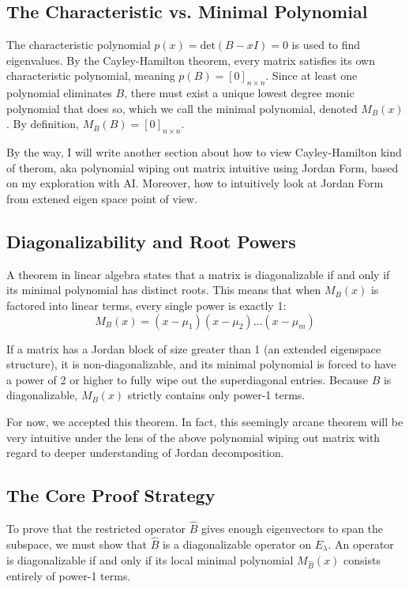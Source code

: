\documentclass{article}
\begin{document}
\subsection{The Characteristic vs. Minimal Polynomial}
The characteristic polynomial $p(x) = \text{det}(B - xI) = 0$ is used to find eigenvalues. By the Cayley-Hamilton theorem, every matrix satisfies its own characteristic polynomial, meaning $p(B) = [0]_{n \times n}$. Since at least one polynomial eliminates $B$, there must exist a unique lowest degree monic polynomial that does so, which we call the minimal polynomial, denoted $M_B(x)$. By definition, $M_B(B) = [0]_{n \times n}$.

By the way, I will write another section about how to view Cayley-Hamilton kind of therom, aka polynomial wiping out matrix intuitive using Jordan Form, based on my exploration with AI. Moreover, how to intuitively look at Jordan Form from extened eigen space point of view. 

\subsection{Diagonalizability and Root Powers}
A theorem in linear algebra states that a matrix is diagonalizable if and only if its minimal polynomial has distinct roots. This means that when $M_B(x)$ is factored into linear terms, every single power is exactly 1:
\[ M_B(x) = (x - \mu_1)(x - \mu_2)\dots(x - \mu_m) \]

If a matrix has a Jordan block of size greater than 1 (an extended eigenspace structure), it is non-diagonalizable, and its minimal polynomial is forced to have a power of 2 or higher to fully wipe out the superdiagonal entries. Because $B$ is diagonalizable, $M_B(x)$ strictly contains only power-1 terms.

For now, we accepted this theorem. In fact, this seemingly arcane theorem will be very intuitive under the lens of the above polynomial wiping out matrix with regard to deeper understanding of Jordan decomposition. 

\subsection{The Core Proof Strategy}
To prove that the restricted operator $\hat{B}$ gives enough eigenvectors to span the subspace, we must show that $\hat{B}$ is a diagonalizable operator on $E_\lambda$. An operator is diagonalizable if and only if its local minimal polynomial $M_{\hat{B}}(x)$ consists entirely of power-1 terms.
\end{document}
